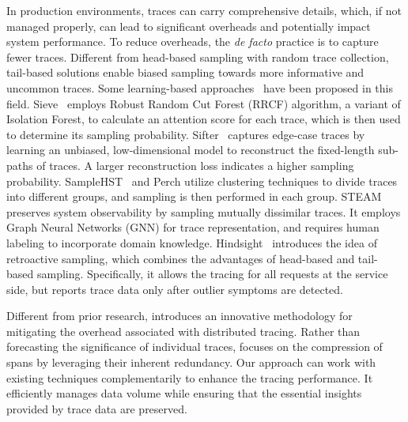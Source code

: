 In production environments, traces can carry comprehensive details, which, if not managed properly, can lead to significant overheads and potentially impact system performance.
To reduce overheads, the \textit{de facto} practice is to capture fewer traces.
Different from head-based sampling with random trace collection, tail-based solutions enable biased sampling towards more informative and uncommon traces.
Some learning-based approaches~\cite{DBLP:conf/IEEEcloud/ChenJSLZ24,DBLP:conf/icws/HuangCYCZ21,DBLP:conf/cloud/Las-CasasPAM19} have been proposed in this field.
Sieve~\cite{DBLP:conf/icws/HuangCYCZ21} employs Robust Random Cut Forest (RRCF) algorithm, a variant of Isolation Forest, to calculate an attention score for each trace, which is then used to determine its sampling probability.
Sifter~\cite{DBLP:conf/cloud/Las-CasasPAM19} captures edge-case traces by learning an unbiased, low-dimensional model to reconstruct the fixed-length sub-paths of traces.
A larger reconstruction loss indicates a higher sampling probability.
SampleHST~\cite{DBLP:conf/noms/GiasGSPOC23} and Perch utilize clustering techniques to divide traces into different groups, and sampling is then performed in each group.
STEAM~\cite{DBLP:conf/sigsoft/HeFLZ0LR023} preserves system observability by sampling mutually dissimilar traces.
It employs Graph Neural Networks (GNN) for trace representation, and requires human labeling to incorporate domain knowledge.
Hindsight~\cite{DBLP:conf/nsdi/ZhangXAVM23} introduces the idea of retroactive sampling, which combines the advantages of head-based and tail-based sampling.
Specifically, it allows the tracing for all requests at the service side, but reports trace data only after outlier symptoms are detected.

Different from prior research, \alias introduces an innovative methodology for mitigating the overhead associated with distributed tracing.
Rather than forecasting the significance of individual traces, \alias focuses on the compression of spans by leveraging their inherent redundancy.
Our approach can work with existing techniques complementarily to enhance the tracing performance.
It efficiently manages data volume while ensuring that the essential insights provided by trace data are preserved.



